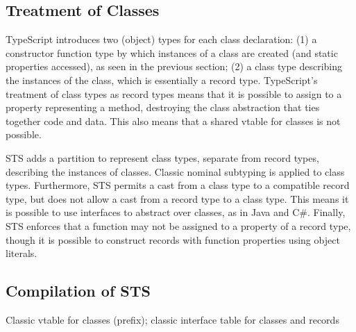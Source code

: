 \subsection{Treatment of Classes}

TypeScript introduces two (object) types for each class declaration: 
(1) a constructor function type by which instances of a class
are created (and static properties accessed), as seen in the previous section; 
(2) a class type describing the instances of the class, which is essentially a record type. 
TypeScript's treatment of class types as record types
means that it is possible to assign to a property representing a method, 
destroying the class abstraction that ties together code and data. This also means
that a shared vtable for classes is not possible. 

STS adds a partition to represent class types, separate from record types, describing the instances of classes.
Classic nominal subtyping is applied to class types. Furthermore, STS permits a cast from a class type
to a compatible record type, but does not allow a cast from a record type to a class type. This means
it is possible to use interfaces to abstract over classes, as in Java and C\#. 
Finally, STS enforces that a function may not
be assigned to a property of a record type, 
though it is possible to construct records with function properties using object literals. 


\subsection{Compilation of STS}


Classic vtable for classes (prefix); classic interface table for classes and records
